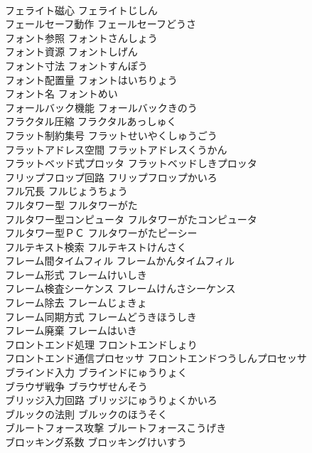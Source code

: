 \documentclass[8pt]{extreport}
\begin{document}
\begin{CJK}{UTF8}{min}
\\	フェライト磁心	フェライトじしん	
\\	フェールセーフ動作	フェールセーフどうさ	
\\	フォント参照	フォントさんしょう	
\\	フォント資源	フォントしげん	
\\	フォント寸法	フォントすんぽう	
\\	フォント配置量	フォントはいちりょう	
\\	フォント名	フォントめい	
\\	フォールバック機能	フォールバックきのう	
\\	フラクタル圧縮	フラクタルあっしゅく	
\\	フラット制約集号	フラットせいやくしゅうごう	
\\	フラットアドレス空間	フラットアドレスくうかん	
\\	フラットベッド式プロッタ	フラットベッドしきプロッタ	
\\	フリップフロップ回路	フリップフロップかいろ	
\\	フル冗長	フルじょうちょう	
\\	フルタワー型	フルタワーがた	
\\	フルタワー型コンピュータ	フルタワーがたコンピュータ	
\\	フルタワー型ＰＣ	フルタワーがたピーシー	
\\	フルテキスト検索	フルテキストけんさく	
\\	フレーム間タイムフィル	フレームかんタイムフィル	
\\	フレーム形式	フレームけいしき	
\\	フレーム検査シーケンス	フレームけんさシーケンス	
\\	フレーム除去	フレームじょきょ	
\\	フレーム同期方式	フレームどうきほうしき	
\\	フレーム廃棄	フレームはいき	
\\	フロントエンド処理	フロントエンドしょり	
\\	フロントエンド通信プロセッサ	フロントエンドつうしんプロセッサ	
\\	ブラインド入力	ブラインドにゅうりょく	
\\	ブラウザ戦争	ブラウザせんそう	
\\	ブリッジ入力回路	ブリッジにゅうりょくかいろ	
\\	ブルックの法則	ブルックのほうそく	
\\	ブルートフォース攻撃	ブルートフォースこうげき	
\\	ブロッキング系数	ブロッキングけいすう	

\end{CJK}
\end{document}
